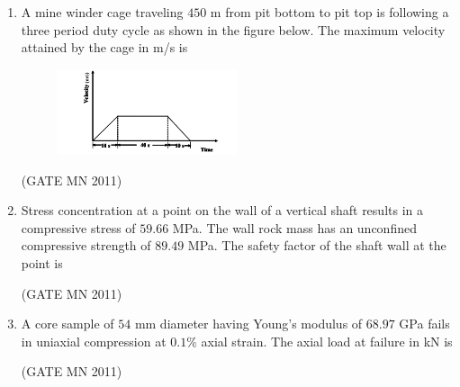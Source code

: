 \documentclass[journal]{IEEEtran}
\begin{document}
\begin{enumerate}
\item A mine winder cage traveling $450$ m from pit bottom to pit top is following a three period duty cycle as shown in the figure below. The maximum velocity attained by the cage in m/s is

\begin{figure}[H]
    \centering
\includegraphics[width=0.5\textwidth]{Screenshot_2025_0813_160511.png} 
\caption{}
    \label{fig:Q7}
    \end{figure}

\hfill(GATE MN 2011)
\begin{enumerate}
\end{enumerate}

\item Stress concentration at a point on the wall of a vertical shaft results in a compressive stress of $59.66$ MPa. The wall rock mass has an unconfined compressive strength of $89.49$ MPa. The safety factor of the shaft wall at the point is

	\hfill(GATE MN 2011)
\begin{enumerate}
\end{enumerate}

\item A core sample of $54$ mm diameter having Young$’$s modulus of $68.97$ GPa fails in uniaxial compression at $0.1\%$ axial strain. The axial load at failure in kN is

	\hfill(GATE MN 2011)
\begin{enumerate}
\end{enumerate}


\end{enumerate}
\end{document}
